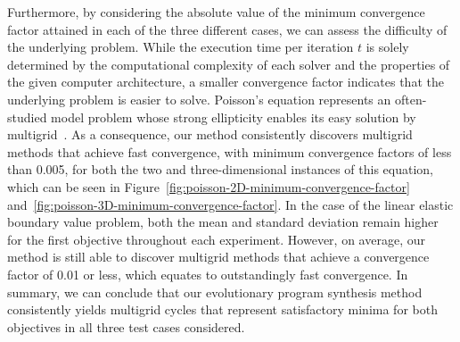 Furthermore, by considering the absolute value of the minimum convergence factor attained in each of the three different cases, we can assess the difficulty of the underlying problem.
While the execution time per iteration $t$ is solely determined by the computational complexity of each solver and the properties of the given computer architecture, a smaller convergence factor indicates that the underlying problem is easier to solve.
Poisson's equation represents an often-studied model problem whose strong ellipticity enables its easy solution by multigrid~\cite{trottenberg2000multigrid}.
As a consequence, our method consistently discovers multigrid methods that achieve fast convergence, with minimum convergence factors of less than 0.005, for both the two and three-dimensional instances of this equation, which can be seen in Figure~\ref{fig:poisson-2D-minimum-convergence-factor} and~\ref{fig:poisson-3D-minimum-convergence-factor}.
In the case of the linear elastic boundary value problem, both the mean and standard deviation remain higher for the first objective throughout each experiment.
However, on average, our method is still able to discover multigrid methods that achieve a convergence factor of 0.01 or less, which equates to outstandingly fast convergence.
In summary, we can conclude that our evolutionary program synthesis method consistently yields multigrid cycles that represent satisfactory minima for both objectives in all three test cases considered.

